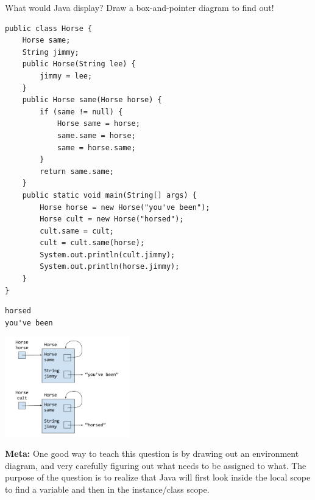 \begin{blocksection}
\question What would Java display? Draw a box-and-pointer diagram to find out!

\begin{lstlisting}
public class Horse {
    Horse same;
    String jimmy;
    public Horse(String lee) {
        jimmy = lee;
    }
    public Horse same(Horse horse) {
        if (same != null) {
            Horse same = horse;
            same.same = horse;
            same = horse.same;
        }
        return same.same;
    }
    public static void main(String[] args) {
        Horse horse = new Horse("you've been");
        Horse cult = new Horse("horsed");
        cult.same = cult;
        cult = cult.same(horse);
        System.out.println(cult.jimmy);
        System.out.println(horse.jimmy);
    }
}
\end{lstlisting}

\begin{solution}[1.5in]
\begin{verbatim}
horsed
you've been
\end{verbatim}

\includegraphics[height=1.7in]{samehorse}

\textbf{Meta:} One good way to teach this question is by drawing out an
environment diagram, and very carefully figuring out what needs to be assigned
to what. The purpose of the question is to realize that Java will first look
inside the local scope to find a variable and then in the instance/class scope.
\end{solution}
\end{blocksection}
